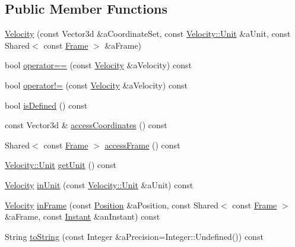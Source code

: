 \subsection*{Public Member Functions}
\begin{DoxyCompactItemize}
\item 
\hyperlink{classlibrary_1_1physics_1_1coord_1_1_velocity_a4e2058adb91710a45a6d8165fae9e8e0}{Velocity} (const Vector3d \&a\+Coordinate\+Set, const \hyperlink{classlibrary_1_1physics_1_1coord_1_1_velocity_a8bbc811932c454dbe0ab8b56f1b2c0b3}{Velocity\+::\+Unit} \&a\+Unit, const Shared$<$ const \hyperlink{classlibrary_1_1physics_1_1coord_1_1_frame}{Frame} $>$ \&a\+Frame)
\item 
bool \hyperlink{classlibrary_1_1physics_1_1coord_1_1_velocity_afa328f637276f940812aea194836aeb9}{operator==} (const \hyperlink{classlibrary_1_1physics_1_1coord_1_1_velocity}{Velocity} \&a\+Velocity) const
\item 
bool \hyperlink{classlibrary_1_1physics_1_1coord_1_1_velocity_aaa76cc11a5ecbbff21839f1ea5f8aa8e}{operator!=} (const \hyperlink{classlibrary_1_1physics_1_1coord_1_1_velocity}{Velocity} \&a\+Velocity) const
\item 
bool \hyperlink{classlibrary_1_1physics_1_1coord_1_1_velocity_a5487f6d50e13d2262bf0726ed8536c99}{is\+Defined} () const
\item 
const Vector3d \& \hyperlink{classlibrary_1_1physics_1_1coord_1_1_velocity_aea8fe9c62293e20393d9a662f277b0e7}{access\+Coordinates} () const
\item 
Shared$<$ const \hyperlink{classlibrary_1_1physics_1_1coord_1_1_frame}{Frame} $>$ \hyperlink{classlibrary_1_1physics_1_1coord_1_1_velocity_a1d3dc032dba7937276b06649cb16a871}{access\+Frame} () const
\item 
\hyperlink{classlibrary_1_1physics_1_1coord_1_1_velocity_a8bbc811932c454dbe0ab8b56f1b2c0b3}{Velocity\+::\+Unit} \hyperlink{classlibrary_1_1physics_1_1coord_1_1_velocity_aa04a5b82a46d5ea4e92bf53046a18494}{get\+Unit} () const
\item 
\hyperlink{classlibrary_1_1physics_1_1coord_1_1_velocity}{Velocity} \hyperlink{classlibrary_1_1physics_1_1coord_1_1_velocity_a814e6740d6b54cf5421d9aa7fc0f5958}{in\+Unit} (const \hyperlink{classlibrary_1_1physics_1_1coord_1_1_velocity_a8bbc811932c454dbe0ab8b56f1b2c0b3}{Velocity\+::\+Unit} \&a\+Unit) const
\item 
\hyperlink{classlibrary_1_1physics_1_1coord_1_1_velocity}{Velocity} \hyperlink{classlibrary_1_1physics_1_1coord_1_1_velocity_ac2e825fe682f526884764218425a14b7}{in\+Frame} (const \hyperlink{classlibrary_1_1physics_1_1coord_1_1_position}{Position} \&a\+Position, const Shared$<$ const \hyperlink{classlibrary_1_1physics_1_1coord_1_1_frame}{Frame} $>$ \&a\+Frame, const \hyperlink{classlibrary_1_1physics_1_1time_1_1_instant}{Instant} \&an\+Instant) const
\item 
String \hyperlink{classlibrary_1_1physics_1_1coord_1_1_velocity_a16c176cadc68b384eb3d8e5594b316bd}{to\+String} (const Integer \&a\+Precision=Integer\+::\+Undefined()) const
\end{DoxyCompactItemize}
